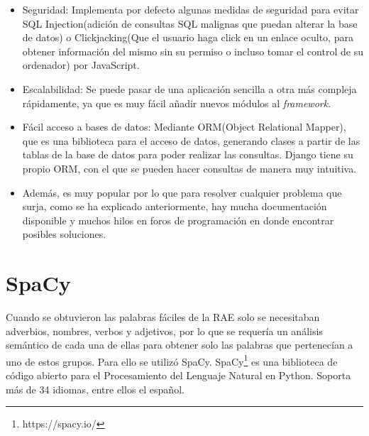 \begin{itemize}
	\item Seguridad: Implementa por defecto algunas medidas de seguridad para evitar SQL Injection(adición de consultas SQL malignas que puedan alterar la base de datos) o Clickjacking(Que el usuario haga click en un enlace oculto, para obtener información del mismo sin su permiso o incluso tomar el control de su ordenador) por JavaScript.
	
	\item Escalabilidad: Se puede pasar de una aplicación sencilla a otra más compleja rápidamente, ya que es muy fácil añadir nuevos módulos al \textit{framework}.
	
	\item Fácil acceso a bases de datos: Mediante ORM(Object Relational Mapper), que es una biblioteca para el acceso de datos, generando clases a partir de las tablas de la base de datos para poder realizar las consultas. Django tiene su propio ORM, con el que se pueden hacer consultas de manera muy intuitiva.
	
	\item Además, es muy popular por lo que para resolver cualquier problema que surja, como se ha explicado anteriormente, hay mucha documentación disponible y muchos hilos en foros de programación en donde encontrar posibles soluciones.
	
\end{itemize}



\section{SpaCy}
\label{cap:sec:spacy}
Cuando se obtuvieron las palabras fáciles de la RAE solo se necesitaban adverbios, nombres, verbos y adjetivos, por lo que se requería un análisis semántico de cada una de ellas para obtener solo las palabras que pertenecían a uno de estos grupos. Para ello se utilizó SpaCy. 
SpaCy\footnote{https://spacy.io/} es una biblioteca de código abierto para el Procesamiento del Lenguaje Natural en Python. Soporta más de 34 idiomas, entre ellos el español.




